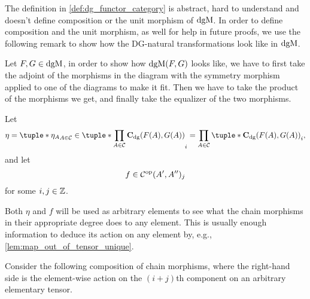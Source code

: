 The definition in \autoref{def:dg_functor_category} is abstract, hard to understand and doesn't define composition or the unit morphism of \( \operatorname{dgM} \). In order to define composition and the unit morphism, as well for help in future proofs, we use the following remark to show how the DG-natural transformations look like in \( \operatorname{dgM} \).

\begin{remark}
    Let \( F, G \in \operatorname{dgM} \), in order to show how \( \operatorname{dgM}(F, G) \) looks like, we have to first take the adjoint of the morphisms in the diagram \cite[Diagram 6.21]{Borceux_1994} with the symmetry morphism applied to one of the diagrams to make it fit. Then we have to take the product of the morphisms we get, and finally take the equalizer of the two morphisms.
    
    Let
    \[
        \eta = \tuple*{ \eta_A }_{A \in \Cc} \in \tuple*{ \prod_{A \in \Cc} \C_{\dg}(F(A), G(A)) }_i = \prod_{A \in \Cc} \tuple*{ \C_{\dg}(F(A), G(A)) }_i,
    \]
    and let
    \[
        f \in {\mathcal{C}}^{\operatorname{op}}(A', A'')_j
    \]
    for some \( i, j \in {\mathbb{Z}} \).

    Both \( \eta \) and \( f \) will be used as arbitrary elements to see what the chain morphisms in their appropriate degree does to any element. This is usually enough information to deduce its action on any element by, e.g., \autoref{lem:map_out_of_tensor_unique}.

    Consider the following composition of chain morphisms, where the right-hand side is the element-wise action on the \( (i + j) \)th component on an arbitrary elementary tensor.
    \begin{diagramlabel}[\label{diag:functor_category_borceux}]
        \newcommand{\height}{1cm}
        \mmznext{meaning to context=\height}
\end{diagramlabel}
\end{remark}
